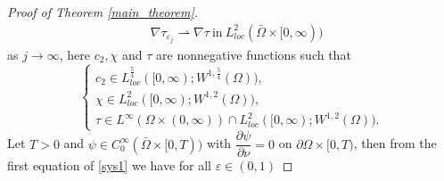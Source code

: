 \documentclass[a4paper,10pt]{article}
\theoremstyle{definition}
\begin{document}
\begin{proof}[Proof of Theorem \ref{main_theorem}]
\begin{align}
  \label{mth9} & \nabla \tau_{\varepsilon_j}  \rightharpoonup \nabla \tau ~\text{in}~ L^{2}_{loc}(\bar{\Omega} \times [0, \infty))
\end{align}
as $j \to \infty$, here $c_2, \chi$ and $\tau$ are nonnegative functions such that
\begin{equation}
\label{2mth1}
  \begin{cases}
    c_2 \in L^{\frac{5}{4}}_{loc}([0, \infty); W^{1, \frac{5}{4}}(\Omega)),                          \\[5pt]
    \chi \in  L^2_{loc}([0, \infty) ; W^{1, 2}(\Omega)),        \\[5pt]
    \tau \in L^\infty(\Omega \times (0, \infty)) \cap L^2_{loc}([0, \infty) ; W^{1, 2}(\Omega)).
  \end{cases}
\end{equation}
Let $T > 0$ and $\psi \in C^\infty_0(\bar{\Omega} \times [0, T))$ with $\dfrac{\partial \psi}{\partial \nu} = 0$ on $\partial \Omega \times [0, T)$, then from the first equation of \eqref{sys1} we have for all $\varepsilon \in (0, 1)$


\end{proof}
\end{document}
